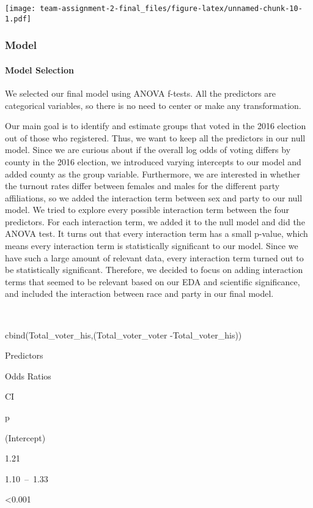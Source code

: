 \documentclass[
]{article}
\begin{document}
\texttt{[image: team-assignment-2-final\_files/figure-latex/unnamed-chunk-10-1.pdf]}

\hypertarget{model-1}{%
\subsubsection{Model}\label{model-1}}

\hypertarget{model-selection}{%
\paragraph{Model Selection}\label{model-selection}}

We selected our final model using ANOVA f-tests. All the predictors are
categorical variables, so there is no need to center or make any
transformation.

Our main goal is to identify and estimate groups that voted in the 2016
election out of those who registered. Thus, we want to keep all the
predictors in our null model. Since we are curious about if the overall
log odds of voting differs by county in the 2016 election, we introduced
varying intercepts to our model and added county as the group variable.
Furthermore, we are interested in whether the turnout rates differ
between females and males for the different party affiliations, so we
added the interaction term between sex and party to our null model. We
tried to explore every possible interaction term between the four
predictors. For each interaction term, we added it to the null model and
did the ANOVA test. It turns out that every interaction term has a small
p-value, which means every interaction term is statistically significant
to our model. Since we have such a large amount of relevant data, every
interaction term turned out to be statistically significant. Therefore,
we decided to focus on adding interaction terms that seemed to be
relevant based on our EDA and scientific significance, and included the
interaction between race and party in our final model.

~

cbind(Total\_voter\_his,(Total\_voter\_voter -Total\_voter\_his))

Predictors

Odds Ratios

CI

p

(Intercept)

1.21

1.10~--~1.33

\textless0.001
\end{document}
